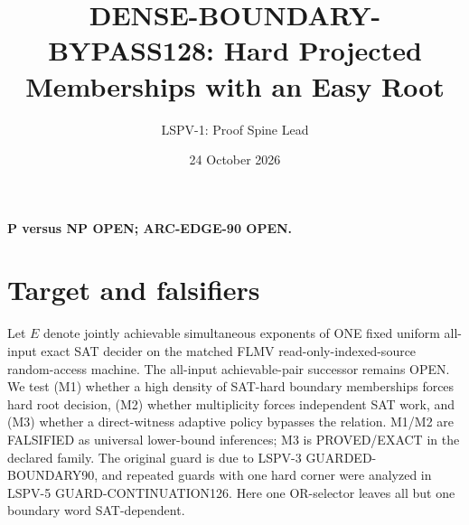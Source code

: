 \documentclass[11pt]{article}
\title{DENSE-BOUNDARY-BYPASS128: Hard Projected Memberships with an Easy Root}
\author{LSPV-1: Proof Spine Lead}
\date{24 October 2026}
\begin{document}
\maketitle
\begin{center}\textbf{P versus NP OPEN; ARC-EDGE-90 OPEN.}\end{center}
\section{Target and falsifiers}
Let $E$ denote jointly achievable simultaneous exponents of ONE fixed uniform all-input exact SAT decider on the matched FLMV read-only-indexed-source random-access machine. The all-input achievable-pair successor remains OPEN. We test (M1) whether a high density of SAT-hard boundary memberships forces hard root decision, (M2) whether multiplicity forces independent SAT work, and (M3) whether a direct-witness adaptive policy bypasses the relation. M1/M2 are FALSIFIED as universal lower-bound inferences; M3 is PROVED/EXACT in the declared family. The original guard is due to LSPV-3 GUARDED-BOUNDARY90, and repeated guards with one hard corner were analyzed in LSPV-5 GUARD-CONTINUATION126. Here one OR-selector leaves all but one boundary word SAT-dependent.
\end{document}
